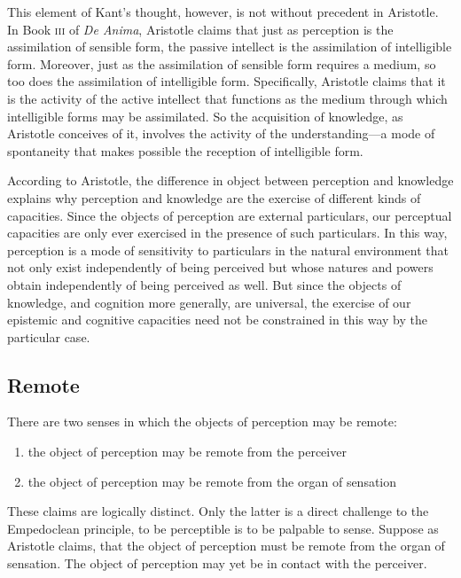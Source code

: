 This element of Kant's thought, however, is not without precedent in Aristotle. In Book \textsc{iii} of \emph{De Anima}, Aristotle claims that just as perception is the assimilation of sensible form, the passive intellect is the assimilation of intelligible form. Moreover, just as the assimilation of sensible form requires a medium, so too does the assimilation of intelligible form. Specifically, Aristotle claims that it is the activity of the active intellect that functions as the medium through which intelligible forms may be assimilated. So the acquisition of knowledge, as Aristotle conceives of it, involves the activity of the understanding---a mode of spontaneity that makes possible the reception of intelligible form.

According to Aristotle, the difference in object between perception and know\-ledge explains why perception and knowledge are the exercise of different kinds of capacities. Since the objects of perception are external particulars, our perceptual capacities are only ever exercised in the presence of such particulars. In this way, perception is a mode of sensitivity to particulars in the natural environment that not only exist independently of being perceived but whose natures and powers obtain independently of being perceived as well. But since the objects of knowledge, and cognition more generally, are universal, the exercise of our epistemic and cognitive capacities need not be constrained in this way by the particular case.


\subsection{Remote} %
\label{sub:remote}

There are two senses in which the objects of perception may be remote:
\begin{enumerate}[(1)]
	\item the object of perception may be remote from the perceiver
	\item the object of perception may be remote from the organ of sensation
\end{enumerate}
These claims are logically distinct. Only the latter is a direct challenge to the Empedoclean principle, to be perceptible is to be palpable to sense. Suppose as Aristotle claims, that the object of perception must be remote from the organ of sensation. The object of perception may yet be in contact with the perceiver.

